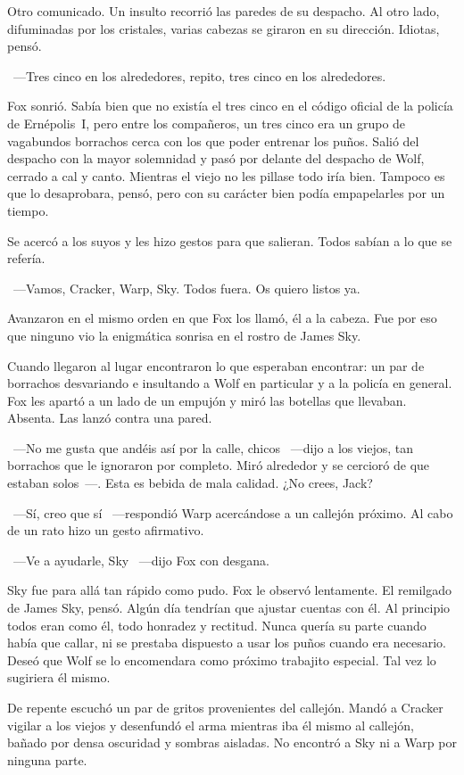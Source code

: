 Otro comunicado. Un insulto recorrió las paredes de su despacho. Al otro lado, difuminadas por los cristales, varias cabezas se giraron en su dirección. Idiotas, pensó.

~---Tres cinco en los alrededores, repito, tres cinco en los alrededores.

Fox sonrió. Sabía bien que no existía el tres cinco en el código oficial de la policía de Ernépolis~I, pero entre los compañeros, un tres cinco era un grupo de vagabundos borrachos cerca con los que poder entrenar los puños. Salió del despacho con la mayor solemnidad y pasó por delante del despacho de Wolf, cerrado a cal y canto. Mientras el viejo no les pillase todo iría bien. Tampoco es que lo desaprobara, pensó, pero con su carácter bien podía empapelarles por un tiempo.

Se acercó a los suyos y les hizo gestos para que salieran. Todos sabían a lo que se refería.

~---Vamos, Cracker, Warp, Sky. Todos fuera. Os quiero listos ya.

Avanzaron en el mismo orden en que Fox los llamó, él a la cabeza. Fue por eso que ninguno vio la enigmática sonrisa en el rostro de James Sky.


Cuando llegaron al lugar encontraron lo que esperaban encontrar: un par de borrachos desvariando e insultando a Wolf en particular y a la policía en general. Fox les apartó a un lado de un empujón y miró las botellas que llevaban. Absenta. Las lanzó contra una pared.

~---No me gusta que andéis así por la calle, chicos ~---dijo a los viejos, tan borrachos que le ignoraron por completo. Miró alrededor y se cercioró de que estaban solos~---. Esta es bebida de mala calidad. ¿No crees, Jack?

~---Sí, creo que sí ~---respondió Warp acercándose a un callejón próximo. Al cabo de un rato hizo un gesto afirmativo.

~---Ve a ayudarle, Sky ~---dijo Fox con desgana.

Sky fue para allá tan rápido como pudo. Fox le observó lentamente. El remilgado de James Sky, pensó. Algún día tendrían que ajustar cuentas con él. Al principio todos eran como él, todo honradez y rectitud. Nunca quería su parte cuando había que callar, ni se prestaba dispuesto a usar los puños cuando era necesario. Deseó que Wolf se lo encomendara como próximo trabajito especial. Tal vez lo sugiriera él mismo.

De repente escuchó un par de gritos provenientes del callejón. Mandó a Cracker vigilar a los viejos y desenfundó el arma mientras iba él mismo al callejón, bañado por densa oscuridad y sombras aisladas. No encontró a Sky ni a Warp por ninguna parte.

